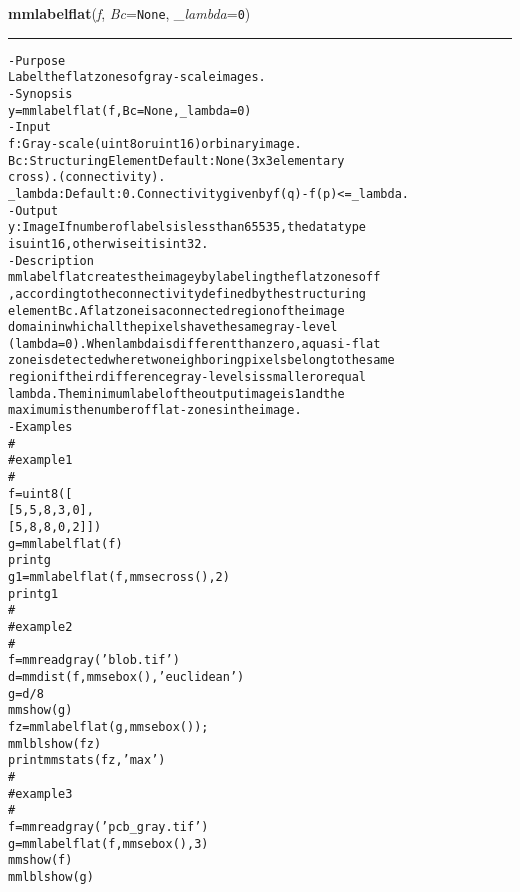     \begin{boxedminipage}{\textwidth}

    \raggedright \textbf{mmlabelflat}(\textit{f}, \textit{Bc}=\texttt{N\-o\-n\-e\-}, \textit{\_lambda}=\texttt{0\-})

    \vspace{-1.5ex}

    \rule{\textwidth}{0.5\fboxrule}
\begin{alltt}
- Purpose
    Label the flat zones of gray-scale images.
- Synopsis
    y = mmlabelflat(f, Bc=None, \_lambda=0)
- Input
    f:       Gray-scale (uint8 or uint16) or binary image.
    Bc:      Structuring Element Default: None (3x3 elementary
             cross). ( connectivity).
    \_lambda: Default: 0. Connectivity given by {\textbar}f(q)-f(p){\textbar}{\textless}=\_lambda.
- Output
    y: Image If number of labels is less than 65535, the data type
       is uint16, otherwise it is int32.
- Description
    mmlabelflat creates the image y by labeling the flat zones of f
    , according to the connectivity defined by the structuring
    element Bc . A flat zone is a connected region of the image
    domain in which all the pixels have the same gray-level
    (lambda=0 ). When lambda is different than zero, a quasi-flat
    zone is detected where two neighboring pixels belong to the same
    region if their difference gray-levels is smaller or equal
    lambda . The minimum label of the output image is 1 and the
    maximum is the number of flat-zones in the image.
- Examples
    \#
    \#   example 1
    \#
    f=uint8([
       [5,5,8,3,0],
       [5,8,8,0,2]])
    g=mmlabelflat(f)
    print g
    g1=mmlabelflat(f,mmsecross(),2)
    print g1
    \#
    \#   example 2
    \#
    f=mmreadgray('blob.tif')
    d=mmdist(f,mmsebox(),'euclidean')
    g= d /8
    mmshow(g)
    fz=mmlabelflat(g,mmsebox());
    mmlblshow(fz)
    print mmstats(fz,'max')
    \#
    \#   example 3
    \#
    f=mmreadgray('pcb\_gray.tif')
    g=mmlabelflat(f,mmsebox(),3)
    mmshow(f)
    mmlblshow(g)\end{alltt}

    \vspace{1ex}

    \end{boxedminipage}

    \label{multireg:num_pymorph:mmlastero}
    \vspace{0.5ex}

